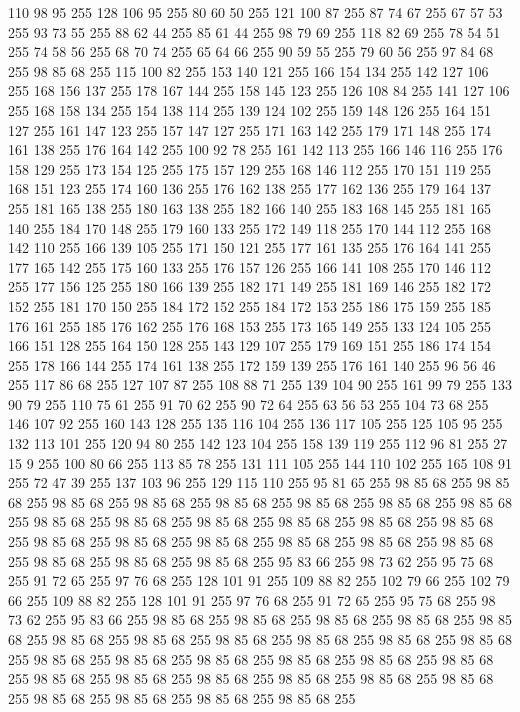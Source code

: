 110 98 95 255 128 106 95 255 80 60 50 255 121 100 87 255 87 74 67 255 67 57 53 255 93 73 55 255 88 62 44 255 85 61 44 255 98 79 69 255 118 82 69 255 78 54 51 255 74 58 56 255 68 70 74 255 65 64 66 255 90 59 55 255 79 60 56 255 97 84 68 255 98 85 68 255 115 100 82 255 153 140 121 255 166 154 134 255 142 127 106 255 168 156 137 255 178 167 144 255 158 145 123 255 126 108 84 255 141 127 106 255 168 158 134 255 154 138 114 255 139 124 102 255 159 148 126 255 164 151 127 255 161 147 123 255 157 147 127 255 171 163 142 255 179 171 148 255 174 161 138 255 176 164 142 255 100 92 78 255 161 142 113 255 166 146 116 255 176 158 129 255 173 154 125 255 175 157 129 255 168 146 112 255 170 151 119 255 168 151 123 255 174 160 136 255 176 162 138 255 177 162 136 255 179 164 137 255 181 165 138 255 180 163 138 255 182 166 140 255 183 168 145 255 181 165 140 255 184 170 148 255 179 160 133 255 172 149 118 255 170 144 112 255 168 142 110 255 166 139 105 255 171 150 121 255
177 161 135 255 176 164 141 255 177 165 142 255 175 160 133 255 176 157 126 255 166 141 108 255 170 146 112 255 177 156 125 255 180 166 139 255 182 171 149 255 181 169 146 255 182 172 152 255 181 170 150 255 184 172 152 255 184 172 153 255 186 175 159 255 185 176 161 255 185 176 162 255 176 168 153 255 173 165 149 255 133 124 105 255 166 151 128 255 164 150 128 255 143 129 107 255 179 169 151 255 186 174 154 255 178 166 144 255 174 161 138 255 172 159 139 255 176 161 140 255 96 56 46 255 117 86 68 255 127 107 87 255 108 88 71 255 139 104 90 255 161 99 79 255 133 90 79 255 110 75 61 255 91 70 62 255 90 72 64 255 63 56 53 255 104 73 68 255 146 107 92 255 160 143 128 255 135 116 104 255 136 117 105 255 125 105 95 255 132 113 101 255 120 94 80 255 142 123 104 255 158 139 119 255 112 96 81 255 27 15 9 255 100 80 66 255 113 85 78 255 131 111 105 255 144 110 102 255 165 108 91 255 72 47 39 255 137 103 96 255 129 115 110 255 95 81 65 255 98 85 68 255 98 85 68 255
98 85 68 255 98 85 68 255 98 85 68 255 98 85 68 255 98 85 68 255 98 85 68 255 98 85 68 255 98 85 68 255 98 85 68 255 98 85 68 255 98 85 68 255 98 85 68 255 98 85 68 255 98 85 68 255 98 85 68 255 98 85 68 255 98 85 68 255 98 85 68 255 98 85 68 255 98 85 68 255 98 85 68 255 95 83 66 255 98 73 62 255 95 75 68 255 91 72 65 255 97 76 68 255 128 101 91 255 109 88 82 255 102 79 66 255 102 79 66 255 109 88 82 255 128 101 91 255 97 76 68 255 91 72 65 255 95 75 68 255 98 73 62 255 95 83 66 255 98 85 68 255 98 85 68 255 98 85 68 255 98 85 68 255 98 85 68 255 98 85 68 255 98 85 68 255 98 85 68 255 98 85 68 255 98 85 68 255 98 85 68 255 98 85 68 255 98 85 68 255 98 85 68 255 98 85 68 255 98 85 68 255 98 85 68 255 98 85 68 255 98 85 68 255 98 85 68 255 98 85 68 255 98 85 68 255 98 85 68 255 98 85 68 255 98 85 68 255 98 85 68 255 98 85 68 255
